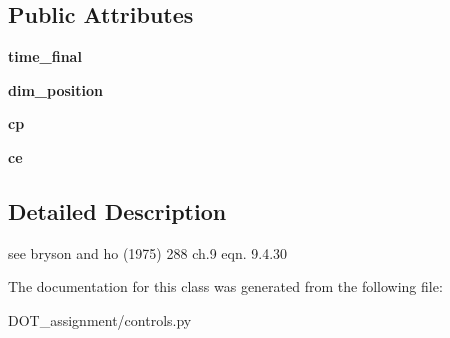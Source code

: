 \subsection*{Public Attributes}
\begin{DoxyCompactItemize}
\item 
\mbox{\label{class_d_o_t__assignment_1_1controls_1_1_minimum_time_intercept_ab15f927274a14cb4a8bb1feca0151a63}} 
{\bfseries time\+\_\+final}
\item 
\mbox{\label{class_d_o_t__assignment_1_1controls_1_1_minimum_time_intercept_adc4c44b8e77735331ca3ef8f60d55ee0}} 
{\bfseries dim\+\_\+position}
\item 
\mbox{\label{class_d_o_t__assignment_1_1controls_1_1_minimum_time_intercept_a2b09dcff0c4cccbaf0f520ba7cefafc5}} 
{\bfseries cp}
\item 
\mbox{\label{class_d_o_t__assignment_1_1controls_1_1_minimum_time_intercept_aac59efc7e470c57b61a7a6e0845a315c}} 
{\bfseries ce}
\end{DoxyCompactItemize}


\subsection{Detailed Description}
\begin{DoxyVerb}see bryson and ho (1975) 288 ch.9 eqn. 9.4.30
\end{DoxyVerb}
 

The documentation for this class was generated from the following file\+:\begin{DoxyCompactItemize}
\item 
D\+O\+T\+\_\+assignment/controls.\+py\end{DoxyCompactItemize}
